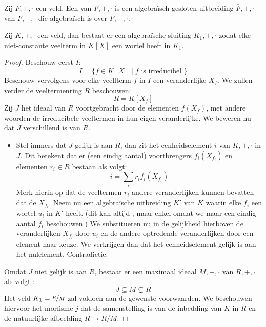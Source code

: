 \documentclass[main.tex]{subfiles}
\begin{document}
\begin{de}
  Zij $F,+,\cdot$ een veld.
  Een  van $F,+,\cdot$ is een algebra\"isch gesloten uitbreiding $\overline{F},+,\cdot$ van $F,+,\cdot$ die algebra\"isch is over $F,+,\cdot$.
\end{de}

\begin{lem}
  \label{lem:bestaan-algebraische-sluiting}
  Zij $K,+,\cdot$ een veld, dan bestaat er een algebra\"ische sluiting $K_{1},+,\cdot$ zodat elke niet-constante veelterm in $K[X]$ een wortel heeft in $K_{1}$.

  \begin{proof}
    Beschouw eerst $I$:
    \[ I = \{ f\in K[X] \mid f \text{ is irreducibel } \} \]
    Beschouw vervolgens voor elke veellterm $f$ in $I$ een veranderlijke $X_{f}$.
    We zullen verder de veeltermenring $R$ beschouwen:
    \[ R = K[X_{f}] \]
    Zij $J$ het ideaal van $R$ voortgebracht door de elementen $f(X_{f})$, met andere woorden de irreducibele veeltermen in hun eigen veranderlijke.
    We beweren nu dat $J$ verschillend is van $R$.
    \begin{itemize}
    \item 
      Stel immers dat $J$ gelijk is aan $R$, dan zit het eenheidselement $i$ van $K,+,\cdot$ in $J$.
      Dit betekent dat er (een eindig aantal\waarom) voortbrengers $f_{i}(X_{f_{i}})$ en elementen $r_{i}\in R$ bestaan als volgt:
      \[ i = \sum_{i}r_{i}f_{i}(X_{f_{i}}) \] Merk hierin op dat de
      veeltermen $r_{i}$ andere veranderlijken kunnen bevatten dat de
      $X_{f_{i}}$.  Neem nu een algebra\"ische uitbreiding $K'$ van $K$
      waarin elke $f_{i}$ een wortel $u_{i}$ in $K'$ heeft. (dit kan
      altijd , maar
      enkel omdat we maar een eindig aantal $f_{i}$ beschouwen\waarom.)
      We substitueren nu in de gelijkheid hierboven de veranderlijken
      $X_{f_{i}}$ door $u_{i}$ en de andere optredende veranderlijken
      door een element naar keuze.  We verkrijgen dan dat het
      eenheidselement gelijk is aan het nulelement.  Contradictie.
    \end{itemize}
    Omdat $J$ niet gelijk is aan $R$, bestaat er een maximaal ideaal $M,+,\cdot$ van $R,+,\cdot$ als volgt \waarom:
    \[ J \subseteq M \subsetneq R \]
    Het veld $K_{1} = \nicefrac{R}{M}$ zal voldoen aan de gewenste voorwaarden.
    We beschouwen hiervoor het morfisme $j$ dat de samenstelling is van de inbedding van $K$ in $R$ en de natuurlijke afbeelding $R\rightarrow R/M$:

\end{proof}
\end{lem}
\end{document}

